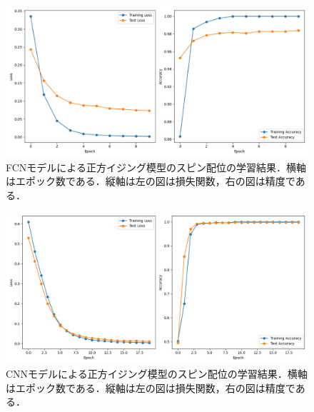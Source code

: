 \documentclass[a4paper,11pt]{jsreport}
\begin{document}
\begin{figure}[H]
  \begin{center}
    \includegraphics[width=\linewidth]{image/plot_square_FCNN_2.png}
    \caption{FCNモデルによる正方イジング模型のスピン配位の学習結果．横軸はエポック数である．縦軸は左の図は損失関数，右の図は精度である．}
    \label{正方イジングFCNloss}
  \end{center}
\end{figure}
\begin{figure}[H]
  \begin{center}
    \includegraphics[width=\linewidth]{image/plot_square_CNN_2.png}
    \caption{CNNモデルによる正方イジング模型のスピン配位の学習結果．横軸はエポック数である．縦軸は左の図は損失関数，右の図は精度である．}
    \label{正方イジングCNNloss}
  \end{center}
\end{figure}
\end{document}

